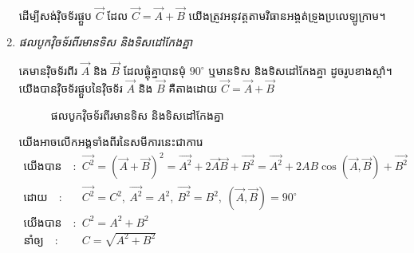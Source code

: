 \begin{enumerate}[m]
\begin{align*}
		\end{align*}
	\begin{remark}
		ដើម្បីសង់វុិចទ័រផ្គួប $\overrightarrow{C}$ ដែល $\overrightarrow{C}=\overrightarrow{A}+\overrightarrow{B}$ យើងត្រូវអនុវត្តតាមវិធានអង្តត់ទ្រូងប្រលេឡូក្រាម។
	\end{remark}
	\item \emph{\kml ផលបូកវុិចទ័រពីរមានទិស និងទិសដៅកែងគ្នា}
	\begin{multicols}{2}
		\quad គេមានវុិចទ័រពីរ $\overrightarrow{A}$ និង $\overrightarrow{B}$ ដែលផ្គុំគ្នាបានមុំ $90^\circ$ ឬមានទិស និងទិសដៅកែងគ្នា ដូចរូបខាងស្តាំ។ យើងបានវុិចទ័រផ្គួបនៃវុិចទ័រ $\overrightarrow{A}$ និង $\overrightarrow{B}$ គឺតាងដោយ $\overrightarrow{C}=\overrightarrow{A}+\overrightarrow{B}$
		\begin{figure}[H]
			\centering
			\caption{\koc ផលបូកវុិចទ័រពីរមានទិស និងទិសដៅកែងគ្នា}
		\end{figure}
	\end{multicols}
	យើងអាចលើកអង្គទាំងពីរនៃសមីការនេះជាការេ
	\begin{align*}
		\text{យើងបាន}\quad :&\quad \overrightarrow{C^{2}} =\left(\overrightarrow{A}+\overrightarrow{B}\right)^{2}=\overrightarrow{A^{2}} + 2\overrightarrow{A}\overrightarrow{B}+\overrightarrow{B^{2}}=\overrightarrow{A^{2}} + 2AB\cos\left(\overrightarrow{A},\overrightarrow{B}\right) +\overrightarrow{B^{2}}\\
		\text{ដោយ}\quad :&\quad \overrightarrow{C^{2}}=C^{2},~\overrightarrow{A^{2}}=A^{2},~\overrightarrow{B^{2}}=B^{2},~\left(\overrightarrow{A},\overrightarrow{B}\right)=90^\circ\\
		\text{យើងបាន}\quad :&\quad C^{2}=A^{2}+B^{2}\\
		\text{នាំឲ្យ}\quad :&\quad C=\sqrt{A^{2}+B^{2}}
	\end{align*}
\end{enumerate}
